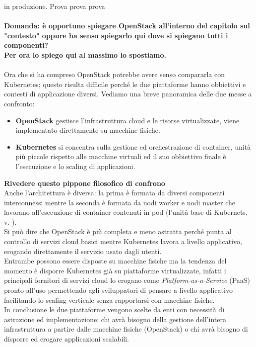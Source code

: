 in produzione.
Prova prova prova
%
%
\\
\\
\textbf{Domanda: è opportuno spiegare OpenStack all'interno del capitolo sul "contesto" oppure ha senso spiegarlo
qui dove si spiegano tutti i componenti?\\
Per ora lo spiego qui al massimo lo spostiamo.}
\\ 
\\
Ora che si ha compreso OpenStack potrebbe avere senso compararla con Kubernetes; questo risulta difficile perché
le due piattaforme hanno obbiettivi e contesti di applicazione diversi. Vediamo una breve panoramica delle due
messe a confronto:
\begin{itemize}
    \item \textbf{OpenStack} gestisce l'infrastruttura cloud e le risorse virtualizzate, viene implementato
        direttamente su macchine fisiche.
    \item \textbf{Kubernetes} si concentra sulla gestione ed orchestrazione di container, unità più piccole
        rispetto alle macchine virtuali ed il suo obbiettivo finale è l'esecuzione e lo scaling di applicazioni.
\end{itemize}
\textbf{Rivedere questo pippone filosofico di confrono} 
\\ 
Anche l'architettura è diversa: la prima è formata da diversi componenti interconnessi mentre la seconda è formata 
da nodi worker e nodi master che lavorano all'esecuzione di container contenuti in pod (l'unità base di Kubernets, v. ).\\
Si può dire che OpenStack è più completa e meno astratta perché punta al controllo di servizi cloud basici mentre Kubernetes lavora 
a livello applicativo, erogando direttamente il servizio usato dagli utenti.\\
Entrambe possono essere disposte su macchine fisiche ma la tendenza del momento è disporre Kubernetes già su piattaforme virtualizzate, infatti 
i principali fornitori di servizi cloud lo erogano come \textit{Platform-as-a-Service} (PaaS) pronto all'uso permettendo agli sviluppatori
di pensare a livello applicativo facilitando lo scaling verticale senza rapportarsi con macchine fisiche.\\
In conclusione le due piattaforme vengono scelte da enti con necessità di astrazione ed implementazione: chi avrà bisogno della gestione 
dell'intera infrastruttura a partire dalle macchine fisiche (OpenStack) o chi avrà bisogno di disporre ed erogare applicazioni scalabili.
